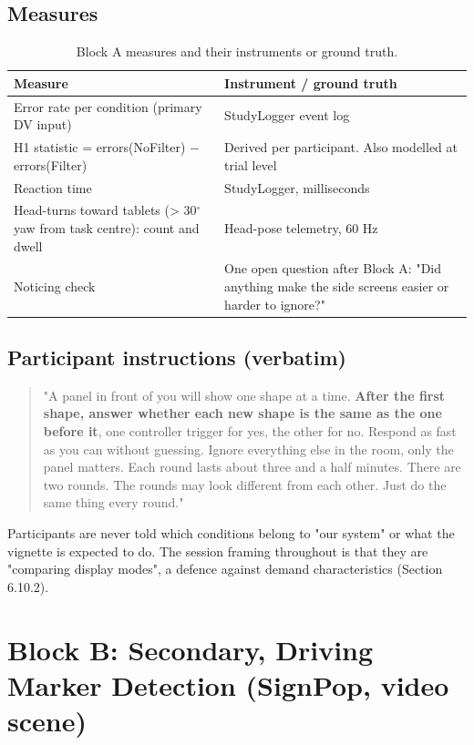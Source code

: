 \subsection{Measures}

\begin{longtable}{p{}|p{}}
\caption{Block A measures and their instruments or ground truth.}\\
\hline
\textbf{Measure} & \textbf{Instrument / ground truth} \\
\hline
\endhead
\hline
Error rate per condition (primary DV input) & StudyLogger event log \\
H1 statistic = errors(NoFilter) $-$ errors(Filter) & Derived per participant. Also modelled at trial level \\
Reaction time & StudyLogger, milliseconds \\
Head-turns toward tablets (> 30$^{\circ}$ yaw from task centre): count and dwell & Head-pose telemetry, 60 Hz \\
Noticing check & One open question after Block A: "Did anything make the side screens easier or harder to ignore?" \\
\hline
\end{longtable}

\subsection{Participant instructions (verbatim)}

\begin{quote}
"A panel in front of you will show one shape at a time. \textbf{After the first shape, answer whether
each new shape is the same as the one before it}, one controller trigger for yes, the other for
no. Respond as fast as you can without guessing. Ignore everything else in the room, only the
panel matters. Each round lasts about three and a half minutes. There are two rounds. The rounds
may look different from each other. Just do the same thing every round."
\end{quote}

Participants are never told which conditions belong to "our system" or what the vignette is expected
to do. The session framing throughout is that they are "comparing display modes", a defence against
demand characteristics (Section 6.10.2).

\section{Block B: Secondary, Driving Marker Detection (SignPop, video scene)}


